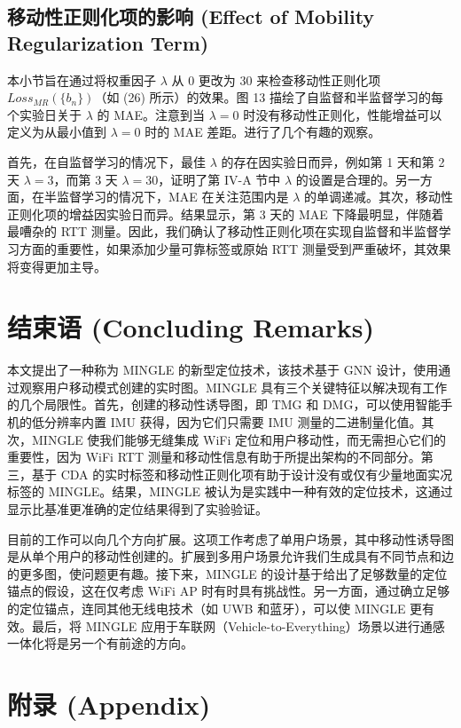 \documentclass[journal]{IEEEtran}
\begin{document}
\subsection{移动性正则化项的影响 (Effect of Mobility Regularization Term)}
本小节旨在通过将权重因子 $\lambda$ 从 0 更改为 30 来检查移动性正则化项 $Loss_{MR}(\{b_{n}\})$（如 (26) 所示）的效果。图 13 描绘了自监督和半监督学习的每个实验日关于 $\lambda$ 的 MAE。注意到当 $\lambda=0$ 时没有移动性正则化，性能增益可以定义为从最小值到 $\lambda=0$ 时的 MAE 差距。进行了几个有趣的观察。

首先，在自监督学习的情况下，最佳 $\lambda$ 的存在因实验日而异，例如第 1 天和第 2 天 $\lambda=3$，而第 3 天 $\lambda=30$，证明了第 IV-A 节中 $\lambda$ 的设置是合理的。另一方面，在半监督学习的情况下，MAE 在关注范围内是 $\lambda$ 的单调递减。其次，移动性正则化项的增益因实验日而异。结果显示，第 3 天的 MAE 下降最明显，伴随着最嘈杂的 RTT 测量。因此，我们确认了移动性正则化项在实现自监督和半监督学习方面的重要性，如果添加少量可靠标签或原始 RTT 测量受到严重破坏，其效果将变得更加主导。

\section{结束语 (Concluding Remarks)}
本文提出了一种称为 MINGLE 的新型定位技术，该技术基于 GNN 设计，使用通过观察用户移动模式创建的实时图。MINGLE 具有三个关键特征以解决现有工作的几个局限性。首先，创建的移动性诱导图，即 TMG 和 DMG，可以使用智能手机的低分辨率内置 IMU 获得，因为它们只需要 IMU 测量的二进制量化值。其次，MINGLE 使我们能够无缝集成 WiFi 定位和用户移动性，而无需担心它们的重要性，因为 WiFi RTT 测量和移动性信息有助于所提出架构的不同部分。第三，基于 CDA 的实时标签和移动性正则化项有助于设计没有或仅有少量地面实况标签的 MINGLE。结果，MINGLE 被认为是实践中一种有效的定位技术，这通过显示比基准更准确的定位结果得到了实验验证。

目前的工作可以向几个方向扩展。这项工作考虑了单用户场景，其中移动性诱导图是从单个用户的移动性创建的。扩展到多用户场景允许我们生成具有不同节点和边的更多图，使问题更有趣。接下来，MINGLE 的设计基于给出了足够数量的定位锚点的假设，这在仅考虑 WiFi AP 时有时具有挑战性。另一方面，通过确立足够的定位锚点，连同其他无线电技术（如 UWB 和蓝牙），可以使 MINGLE 更有效。最后，将 MINGLE 应用于车联网（Vehicle-to-Everything）场景以进行通感一体化将是另一个有前途的方向。

\section{附录 (Appendix)}
\end{document}
